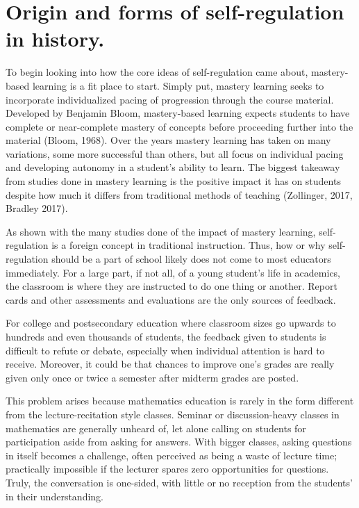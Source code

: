 \section{Origin and forms of self-regulation in history.}

To begin looking into how the core ideas of self-regulation came about, mastery-based learning is a fit place to start. Simply put, mastery learning seeks to incorporate individualized pacing of progression through the course material. Developed by Benjamin Bloom, mastery-based learning expects students to have complete or near-complete mastery of concepts before proceeding further into the material (Bloom, 1968). Over the years mastery learning has taken on many variations, some more successful than others, but all focus on individual pacing and developing autonomy in a student's ability to learn. The biggest takeaway from studies done in mastery learning is the positive impact it has on students despite how much it differs from traditional methods of teaching (Zollinger, 2017, Bradley 2017).

As shown with the many studies done of the impact of mastery learning, self-regulation is a foreign concept in traditional instruction. Thus, how or why self-regulation should be a part of school likely does not come to most educators immediately. For a large part, if not all, of a young student's life in academics, the classroom is where they are instructed to do one thing or another. Report cards and other assessments and evaluations are the only sources of feedback.

For college and postsecondary education where classroom sizes go upwards to hundreds and even thousands of students, the feedback given to students is difficult to refute or debate, especially when individual attention is hard to receive. Moreover, it could be that chances to improve one's grades are really given only once or twice a semester after midterm grades are posted.

This problem arises because mathematics education is rarely in the form different from the lecture-recitation style classes. Seminar or discussion-heavy classes in mathematics are generally unheard of, let alone calling on students for participation aside from asking for answers. With bigger classes, asking questions in itself becomes a challenge, often perceived as being a waste of lecture time; practically impossible if the lecturer spares zero opportunities for questions. Truly, the conversation is one-sided, with little or no reception from the students' in their understanding.

